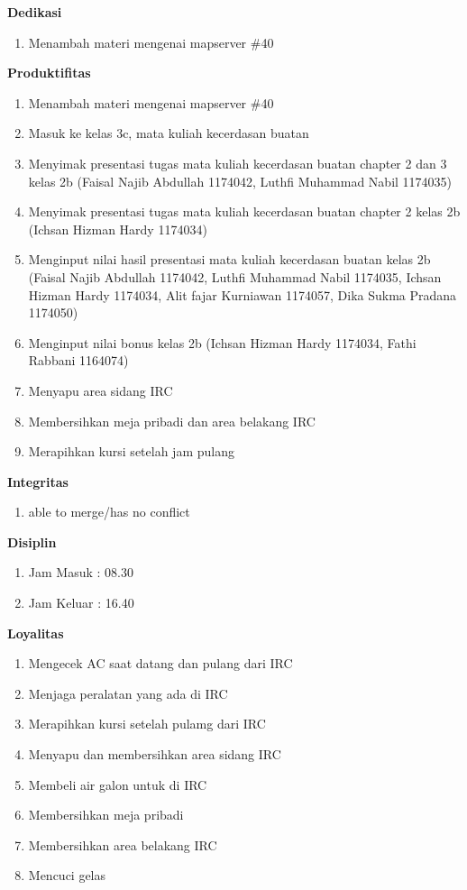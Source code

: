 \begin{enumerate}
\textbf{Dedikasi}
\begin{enumerate}
\item Menambah materi mengenai mapserver \#40
\end{enumerate}

\textbf{Produktifitas}
\begin{enumerate}
\item Menambah materi mengenai mapserver \#40
\item Masuk ke kelas 3c, mata kuliah kecerdasan buatan 
\item Menyimak presentasi tugas mata kuliah kecerdasan buatan chapter 2 dan 3 kelas 2b (Faisal Najib Abdullah 1174042, Luthfi Muhammad Nabil 1174035)
\item Menyimak presentasi tugas mata kuliah kecerdasan buatan chapter 2 kelas 2b (Ichsan Hizman Hardy 1174034)
\item Menginput nilai hasil presentasi mata kuliah kecerdasan buatan kelas 2b (Faisal Najib Abdullah 1174042, Luthfi Muhammad Nabil 1174035, Ichsan Hizman Hardy 1174034, Alit fajar Kurniawan 1174057, Dika Sukma Pradana 1174050)
\item Menginput nilai bonus kelas 2b (Ichsan Hizman Hardy 1174034, Fathi Rabbani 1164074)
\item Menyapu area sidang IRC
\item Membersihkan meja pribadi dan area belakang IRC
\item Merapihkan kursi setelah jam pulang 
\end{enumerate}

\textbf{Integritas}
\begin{enumerate}
\item able to merge/has no conflict
\end{enumerate}

\textbf{Disiplin}
\begin{enumerate}
\item Jam Masuk : 08.30
\item Jam Keluar : 16.40
\end{enumerate}

\textbf{Loyalitas}
\begin{enumerate}
\item Mengecek AC saat datang dan pulang dari IRC
\item Menjaga peralatan yang ada di IRC
\item Merapihkan kursi setelah pulamg dari IRC
\item Menyapu dan membersihkan area sidang IRC
\item Membeli air galon untuk di IRC
\item Membersihkan meja pribadi
\item Membersihkan area belakang IRC
\item Mencuci gelas
\end{enumerate}



\end{enumerate}
